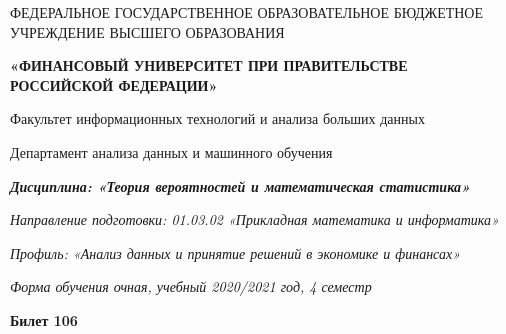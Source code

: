 \documentclass[a4paper,10pt]{article}
\begin{document}
\begin{center}
ФЕДЕРАЛЬНОЕ ГОСУДАРСТВЕННОЕ ОБРАЗОВАТЕЛЬНОЕ БЮДЖЕТНОЕ УЧРЕЖДЕНИЕ ВЫСШЕГО ОБРАЗОВАНИЯ

    \textbf{«ФИНАНСОВЫЙ УНИВЕРСИТЕТ ПРИ ПРАВИТЕЛЬСТВЕ РОССИЙСКОЙ ФЕДЕРАЦИИ»}

Факультет информационных технологий и анализа больших данных

Департамент анализа данных и машинного обучения

\textit{
	\textbf{Дисциплина: «Теория вероятностей и математическая статистика»}}

\textit{Направление подготовки: 01.03.02 «Прикладная математика и информатика»}

\textit{Профиль: «Анализ данных и принятие решений в экономике и финансах»}

\textit{Форма обучения очная, учебный 2020/2021 год, 4 семестр}

\textbf{Билет 106}

\end{center}
\end{document}

